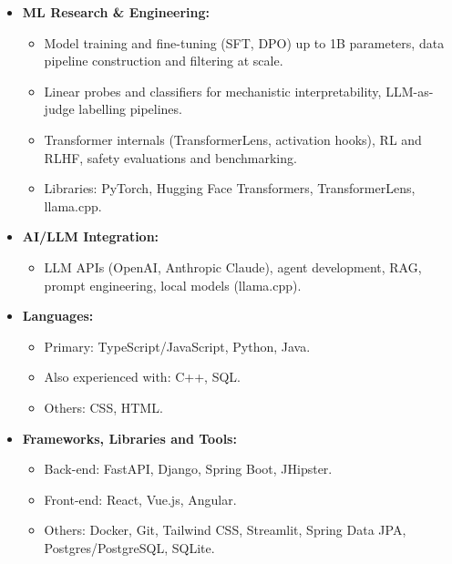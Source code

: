 \documentclass[a4paper,9pt]{article}
\newcommand{\cvsection}[2]{
    \vspace{0.3cm} %
    \noindent {\large \textbf{#1}} %
    \begin{itemize}
        \renewcommand{\labelitemi}{}
        \small #2 %
    \end{itemize}
}
\begin{document}
\cvsection{Technical Skills}{
    \item \textbf{ML Research \& Engineering:}
    \begin{itemize}
        \item Model training and fine-tuning (SFT, DPO) up to 1B parameters, data pipeline construction and filtering at scale.
        \item Linear probes and classifiers for mechanistic interpretability, LLM-as-judge labelling pipelines.
        \item Transformer internals (TransformerLens, activation hooks), RL and RLHF, safety evaluations and benchmarking.
        \item Libraries: PyTorch, Hugging Face Transformers, TransformerLens, llama.cpp.
    \end{itemize}
    \item \textbf{AI/LLM Integration:}
    \begin{itemize}
        \item LLM APIs (OpenAI, Anthropic Claude), agent development, RAG, prompt engineering, local models (llama.cpp).
    \end{itemize}
    \item \textbf{Languages:}
    \begin{itemize}
        \item Primary: TypeScript/JavaScript, Python, Java.
        \item Also experienced with: C++, SQL.
        \item Others: CSS, HTML. 
    \end{itemize}
    \item \textbf{Frameworks, Libraries and Tools:}
    \begin{itemize}
        \item Back-end: FastAPI, Django, Spring Boot, JHipster.
        \item Front-end: React, Vue.js, Angular.
    \item Others: Docker, Git, Tailwind CSS, Streamlit, Spring Data JPA, Postgres/PostgreSQL, SQLite.
    \end{itemize}
}
\end{document}
